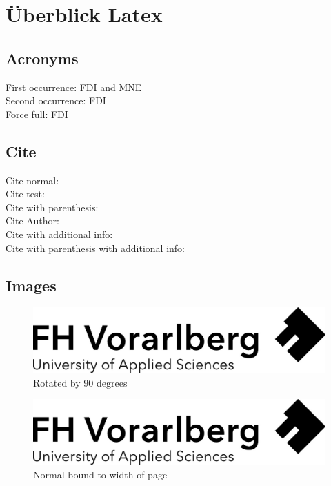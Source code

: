 \chapter{Überblick Latex}\label{ch:overview-latex}
\section{Acronyms}
    First occurrence: \ac{FDI} and \ac{MNE}\\
    Second occurrence: \ac{FDI}\\
    Force full: \acf{FDI}
\section{Cite}
    Cite normal: \cite{HRCS} \\
    Cite test: \cite{george_arnett_foreign_2015} \\
    Cite with parenthesis: \citep{george_arnett_foreign_2014} \\
    Cite Author: \citeauthor{george_arnett_foreign_2014} \\
    Cite with additional info: \citet[Page 2, Fig. I.1]{george_arnett_foreign_2014} \\
    Cite with parenthesis with additional info: \citep[Page 2, Fig. I.1]{george_arnett_foreign_2014}

\section{Images}
\begin{figure}[H] 
  \centering
    \includegraphics[angle=90]{images/Logo-A3.jpg}%
  \caption{Rotated by 90 degrees}
  \label{fig:rotatedImg}
\end{figure}
\begin{figure}[H] 
  \centering
    \includegraphics[width=1\textwidth,angle=0,scale=1]{images/Logo-A3.jpg}%
  \caption{Normal bound to width of page}
  \label{fig:em202y}
\end{figure}
    
